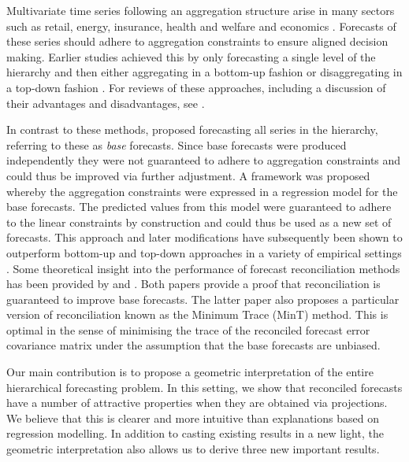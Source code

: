 \documentclass[12pt]{article}
\theoremstyle{definition}
\begin{document}
Multivariate time series following an aggregation structure arise in many sectors such as retail, energy, insurance, health and welfare and economics \citep[see for example][]{KarMal2019, Taieb2017, NysEtAl2019, AlmVan2016, JeoEtAl2019, Mahkya2017, LiTan2019, Shang2017, AthEtAl2019_MacroBook}. Forecasts of these series should adhere to aggregation constraints to ensure aligned decision making. Earlier studies achieved this by only forecasting a single level of the hierarchy and then either aggregating in a bottom-up fashion \citep{Dunn1976} or disaggregating in a top-down fashion \citep{Gross1990, Athanasopoulos2009}. For reviews of these approaches, including a discussion of their advantages and disadvantages, see \citet{Schwarzkopf1988, Kahn1998, Lapide1998, Fliedner2001}.

In contrast to these methods, \citet{Hyndman2011} proposed forecasting all series in the hierarchy, referring to these as \emph{base} forecasts. Since base forecasts were produced independently they were not guaranteed to adhere to aggregation constraints and could thus be improved via further adjustment. A framework was proposed whereby the aggregation constraints were expressed in a regression model for the base forecasts. The predicted values from this model were guaranteed to adhere to the linear constraints by construction and could thus be used as a new set of forecasts. This approach and later modifications have subsequently been shown to outperform bottom-up and top-down approaches in a variety of empirical settings \citep[see for example][among others]{Athanasopoulos2009, AthEtAl2017, WicEtAl2019}. Some theoretical insight into the performance of forecast reconciliation methods has been provided by \citet{VanErven2015a} and \citet{WicEtAl2019}. Both papers provide a proof that reconciliation is guaranteed to improve base forecasts. The latter paper also proposes a particular version of reconciliation known as the Minimum Trace (MinT) method. This is optimal in the sense of minimising the trace of the reconciled forecast error covariance matrix under the assumption that the base forecasts are unbiased.

Our main contribution is to propose a geometric interpretation of the entire hierarchical forecasting problem. In this setting, we show that reconciled forecasts have a number of attractive properties when they are obtained via projections. We believe that this is clearer and more intuitive than explanations based on regression modelling. In addition to casting existing results in a new light, the geometric interpretation also allows us to derive three new important results.
\end{document}
